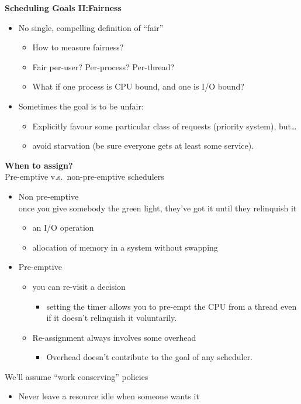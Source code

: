 \documentclass[11pt,a4paper]{article}
\begin{document}
\textbf{Scheduling Goals II:\@ Fairness}
\begin{itemize}
    \item No single, compelling definition of ``fair''
        \begin{itemize}
            \item How to measure fairness?
            \item Fair per-user? Per-process? Per-thread?
            \item What if one process is CPU bound, and one is I/O bound?
        \end{itemize}
    \item Sometimes the goal is to be unfair:
        \begin{itemize}
            \item Explicitly favour some particular class of requests (priority system),
                but\dots
            \item avoid starvation (be sure everyone gets at least some service).
        \end{itemize}
\end{itemize}

\textbf{When to assign?} \\
Pre-emptive v.s.\ non-pre-emptive schedulers
\begin{itemize}
    \item Non pre-emptive \\
        once you give somebody the green light, they've got it until they relinquish it
        \begin{itemize}
            \item an I/O operation
            \item allocation of memory in a system without swapping
        \end{itemize}
    \item Pre-emptive
        \begin{itemize}
            \item you can re-visit a decision
                \begin{itemize}
                    \item setting the timer allows you to pre-empt the CPU from a thread even
                        if it
                        doesn't relinquish it voluntarily.
                \end{itemize}
            \item Re-assignment always involves some overhead
                \begin{itemize}
                    \item Overhead doesn't contribute to the goal of any scheduler.
                \end{itemize}
        \end{itemize}
\end{itemize}
We'll assume ``work conserving'' policies
\begin{itemize}
    \item Never leave a resource idle when someone wants it
\end{itemize}
\end{document}
